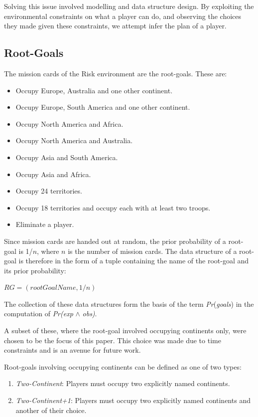 \documentclass[parskip]{cs4rep}
\begin{document}
Solving this issue involved modelling and data structure design. By exploiting the environmental constraints on what a player can do, and observing the choices they made given these constraints, we attempt infer the plan of a player.

\subsection{Root-Goals}

The mission cards of the Risk environment are the root-goals. These are:

\begin{itemize}
\item
Occupy Europe, Australia and one other continent.
\item
Occupy Europe, South America and one other continent.
\item
Occupy North America and Africa.
\item
Occupy North America and Australia.
\item
Occupy Asia and South America.
\item
Occupy Asia and Africa.
\item
Occupy 24 territories.
\item
Occupy 18 territories and occupy each with at least two troops.
\item
Eliminate a player.
\end{itemize}

Since mission cards are handed out at random, the prior probability of a root-goal is 1/$n$, where $n$ is the number of mission cards. The data structure of a root-goal is therefore in the form of a tuple containing the name of the root-goal and its prior probability: 

\centerline{
 $RG = ( rootGoalName, 1/n)$\newline
}

The collection of these data structures form the basis of the term \textit{Pr}(\textit{goals}) in the computation of \textit{Pr(exp} $\wedge$ \textit{obs)}.

A subset of these, where the root-goal involved occupying continents only, were chosen to be the focus of this paper. This choice was made due to time constraints and is an avenue for future work.

Root-goals involving occupying continents can be defined as one of two types:

\begin{enumerate}
\item
\textit{Two-Continent}: Players must occupy two explicitly named continents.
\item
\textit{Two-Continent+1}: Players must occupy two explicitly named continents and another of their choice.
\end{enumerate}
\end{document}
